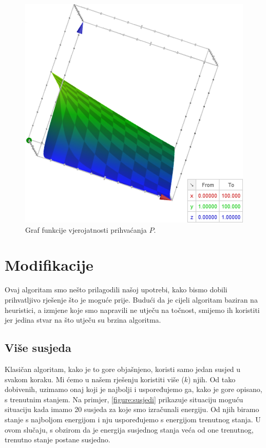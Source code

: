 \documentclass[times, utf8, zavrsni]{fer}
\begin{document}
\begin{figure}
\centering
\includegraphics[scale=0.8]{res/P_graf_de(0_100)_t(1,100).PNG}
\caption[Graf funkcije $P$]{Graf funkcije vjerojatnosti prihvaćanja $P$.}
\label{figure:vjerojatnost}
\end{figure}

\section{Modifikacije}

Ovaj algoritam smo nešto prilagodili našoj upotrebi, kako bismo dobili
prihvatljivo rješenje što je moguće prije. Budući da je cijeli
algoritam baziran na heuristici, a izmjene koje smo napravili
ne utječu na točnost, smijemo ih koristiti jer jedina stvar
na što utječu su brzina algoritma. 

\subsection{Više susjeda}
Klasičan algoritam, kako je to gore objašnjeno, koristi samo jedan susjed u svakom
koraku. Mi ćemo u našem rješenju koristiti više ($k$) njih. Od tako dobivenih,
uzimamo onaj koji je najbolji i uspoređujemo ga, kako je gore opisano,
s trenutnim stanjem. Na primjer, \autoref{figure:susjedi} prikazuje situaciju
moguću situaciju kada imamo 20 susjeda za koje smo izračunali energiju.
Od njih biramo stanje s najboljom energijom i nju uspoređujemo s energijom
trenutnog stanja. U ovom slučaju, s obzirom da je energija susjednog stanja
veća od one trenutnog, trenutno stanje postane susjedno.
\end{document}
